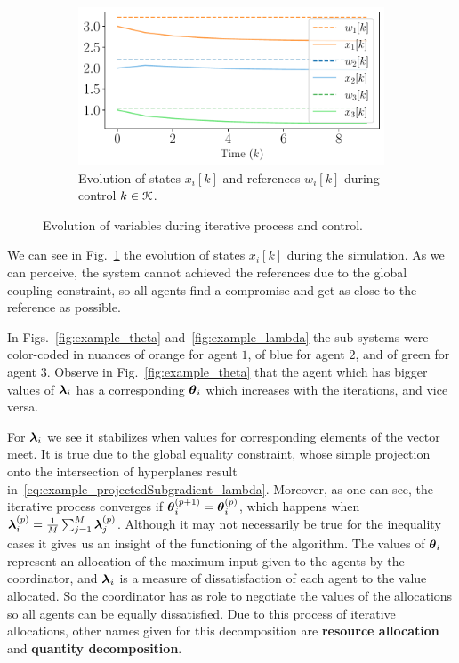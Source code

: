 \documentclass[../main.tex]{subfiles}
\begin{document}
\begin{figure}[h]
  \begin{subfigure}{0.45\textwidth}
    \centering
    \includegraphics[width=\textwidth]{../img/example_primal_decomposition/example_state.pdf}
    \caption{Evolution of states $x_{i}[k]$ and references $w_{i}[k]$ during control ${k\in\mathcal{K}}$.}\label{fig:example_state}
  \end{subfigure}
    \caption{Evolution of variables during iterative process and control.}\label{fig:example_variables}
\end{figure}
We can see in Fig.~\ref{fig:example_state} the evolution of states $x_{i}[k]$ during the simulation.
As we can perceive, the system cannot achieved the references due to the global coupling constraint, so all agents find a compromise and get as close to the reference as possible.

In Figs.~\ref{fig:example_theta} and~\ref{fig:example_lambda} the sub-systems were color-coded in nuances of orange for agent $1$, of blue for agent $2$, and of green for agent $3$.
Observe in Fig.~\ref{fig:example_theta} that the agent which has bigger values of $\boldsymbol{\lambda}_i$ has a corresponding $\boldsymbol{\theta}_i$ which increases with the iterations, and vice versa.

For $\boldsymbol{\lambda}_i$ we see it stabilizes when values for corresponding elements of the vector meet.
It is true due to the global equality constraint, whose simple projection onto the intersection of hyperplanes result in~\eqref{eq:example_projectedSubgradient_lambda}.
Moreover, as one can see, the iterative process converges if ${\boldsymbol{\theta}_i^{(p+1)}=\boldsymbol{\theta}_i^{(p)}}$, which happens when ${\boldsymbol{\lambda}_i^{(p)}=\frac{1}{M}\sum_{j=1}^{M}\boldsymbol{\lambda}_j^{(p)}}$.
Although it may not necessarily be true for the inequality cases it gives us an insight of the functioning of the algorithm.
The values of $\boldsymbol{\theta}_i$ represent an allocation of the maximum input given to the agents by the coordinator, and $\boldsymbol{\lambda}_i$ is a measure of dissatisfaction of each agent to the value allocated.
So the coordinator has as role to negotiate the values of the allocations so all agents can be equally dissatisfied.
Due to this process of iterative allocations, other names given for this decomposition are \textbf{resource allocation} and \textbf{quantity decomposition}.
\end{document}
